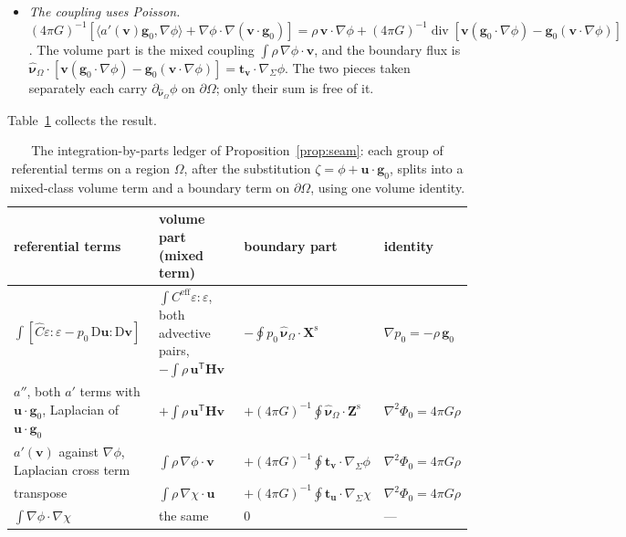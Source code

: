 \documentclass[11pt]{article}
\theoremstyle{definition}
\theoremstyle{remark}
\newcommand{\bu}{\mathbf{u}}
\newcommand{\bv}{\mathbf{v}}
\newcommand{\Div}{\operatorname{div}}
\newcommand{\nuho}{\hat{\boldsymbol{\nu}}_\Omega}
\begin{document}
\begin{itemize}
\begin{equation*}
\begin{aligned}
  \end{aligned}
  \end{equation*}
  Every term quadratic in $\mathbf g_0$ and first order in both
  gradients cancels except $\tfrac12 g^2\mathcal N$. Then
  $\operatorname{tr}\mathbf H = 4\pi G\rho$ and the full symmetry of
  $\nabla\nabla\nabla\Phi_0$ give $\Gamma(\bu, \bv) = \int\rho\,
  \bu^{\mathsf T}\mathbf H\bv + (4\pi G)^{-1}\oint\nuho\cdot\mathbf
  Z(\bu, \bv)$. Its volume term cancels the one the elastic part left.
\item \emph{The coupling uses Poisson.} $(4\pi G)^{-1}[\langle
  a'(\bv)\mathbf g_0, \nabla\phi\rangle + \nabla\phi\cdot\nabla(\bv
  \cdot\mathbf g_0)] = \rho\,\bv\cdot\nabla\phi + (4\pi G)^{-1}
  \Div[\bv(\mathbf g_0\cdot\nabla\phi) - \mathbf g_0(\bv\cdot
  \nabla\phi)]$. The volume part is the mixed coupling $\int\rho\,
  \nabla\phi\cdot\bv$, and the boundary flux is $\nuho\cdot[\bv
  (\mathbf g_0\cdot\nabla\phi) - \mathbf g_0(\bv\cdot\nabla\phi)] =
  \mathbf t_{\bv}\cdot\nabla_\Sigma\phi$. The two pieces taken
  separately each carry $\partial_{\nuho}\phi$ on $\partial\Omega$; only
  their sum is free of it.
\end{itemize}
Table~\ref{tab:seam-ledger} collects the result.

\begin{table}[htbp]
\centering\small
\caption{The integration-by-parts ledger of
Proposition~\ref{prop:seam}: each group of referential terms on a
region $\Omega$, after the substitution $\zeta = \phi + \bu\cdot\mathbf
g_0$, splits into a mixed-class volume term and a boundary term on
$\partial\Omega$, using one volume identity.}
\label{tab:seam-ledger}
\begin{tabular}{@{}p{}p{}p{}l@{}}
\toprule
referential terms & volume part (mixed term) & boundary part & identity \\
\midrule
$\int[\hat C\varepsilon:\varepsilon - p_0\,\mathrm D\bu:\mathrm D\bv]$
  & $\int C^{\mathrm{eff}}\varepsilon:\varepsilon$, both advective pairs, $-\int\rho\,\bu^{\mathsf T}\mathbf H\bv$
  & $-\oint p_0\,\nuho\cdot\mathbf X^{\mathrm s}$ & $\nabla p_0 = -\rho\,\mathbf g_0$ \\
$a''$, both $a'$ terms with $\bu\cdot\mathbf g_0$, Laplacian of $\bu\cdot\mathbf g_0$
  & $+\int\rho\,\bu^{\mathsf T}\mathbf H\bv$
  & $+(4\pi G)^{-1}\oint\nuho\cdot\mathbf Z^{\mathrm s}$ & $\nabla^2\Phi_0 = 4\pi G\rho$ \\
$a'(\bv)$ against $\nabla\phi$, Laplacian cross term
  & $\int\rho\,\nabla\phi\cdot\bv$
  & $+(4\pi G)^{-1}\oint\mathbf t_{\bv}\cdot\nabla_\Sigma\phi$ & $\nabla^2\Phi_0 = 4\pi G\rho$ \\
transpose & $\int\rho\,\nabla\chi\cdot\bu$
  & $+(4\pi G)^{-1}\oint\mathbf t_{\bu}\cdot\nabla_\Sigma\chi$ & $\nabla^2\Phi_0 = 4\pi G\rho$ \\
$\int\nabla\phi\cdot\nabla\chi$ & the same & $0$ & --- \\
\bottomrule
\end{tabular}
\end{table}
\end{document}

